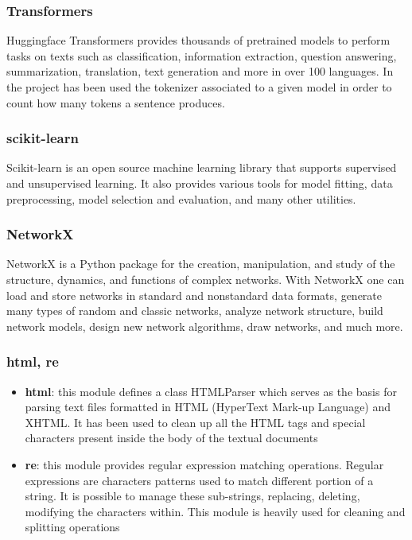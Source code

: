 \documentclass[\main/main.tex]{subfiles}
\begin{document}
\subsubsection{Transformers}
Huggingface Transformers provides thousands of pretrained models to perform tasks on texts such as classification, information extraction, question answering, summarization, translation, text generation and more in over 100 languages. In the project has been used the tokenizer associated to a given model in order to count how many tokens a sentence produces\cite{Wolf_Transformers_StateoftheArt_Natural_2020}.
\subsubsection{scikit-learn}
Scikit-learn is an open source machine learning library that supports supervised and unsupervised learning. It also provides various tools for model fitting, data preprocessing, model selection and evaluation, and many other utilities\cite{scikit-learn}.
\subsubsection{NetworkX}
NetworkX is a Python package for the creation, manipulation, and study of the structure, dynamics, and functions of complex networks. With NetworkX one can load and store networks in standard and nonstandard data formats, generate many types of random and classic networks, analyze network structure, build network models, design new network algorithms, draw networks, and much more\cite{SciPyProceedings_11}.
\subsubsection{html, re}
\begin{itemize}
    \item \textbf{html}: this module defines a class HTMLParser which serves as the basis for parsing text files formatted in HTML (HyperText Mark-up Language) and XHTML. It has been used to clean up all the HTML tags and special characters present inside the body of the textual documents \cite{html_parser}
    \item \textbf{re}: this module provides regular expression matching operations. Regular expressions are characters patterns used to match different portion of a string. It is possible to manage these sub-strings, replacing, deleting, modifying the characters within. This module is heavily used for cleaning and splitting operations \cite{re}
\end{itemize}
\end{document}
